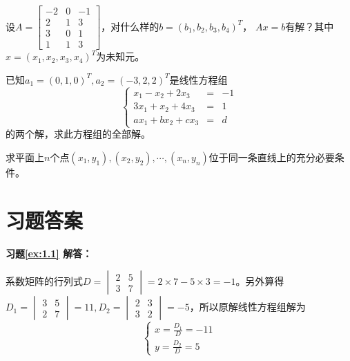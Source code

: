 \begin{ex} \label{ex:1.8}
设$A = \begin{bmatrix} -2 & 0 & -1 \\ 2 & 1 & 3 \\ 3 & 0 & 1 \\ 1 & 1 & 3 \end{bmatrix}$，对什么样的$b = (b_1, b_2, b_3, b_4)^T$， $Ax = b$有解？其中$x = (x_1, x_2, x_3, x_4)^T$为未知元。
\end{ex}

\begin{ex} \label{ex:1.9}
已知$a_1 = (0,1,0)^T, a_2 = (-3,2,2)^T$是线性方程组
$$\left\{ \begin{array}{rcl} x_1 - x_2 + 2x_3 & = & -1 \\ 3x_1 + x_2 + 4x_3 & = & 1 \\ ax_1 + bx_2 + cx_3 & = & d\end{array}\right.$$
的两个解，求此方程组的全部解。
\end{ex}

\begin{ex} \label{ex:1.10}
求平面上$n$个点$(x_1,y_1),(x_2,y_2),\cdots,(x_n,y_n)$位于同一条直线上的充分必要条件。
\end{ex}

\newpage


\section{习题答案}

\textbf{习题\ref{ex:1.1} 解答：}

\enum
\item[(1)] 系数矩阵的行列式$D = \begin{vmatrix} 2 & 5 \\ 3 & 7 \end{vmatrix} = 2\times 7 - 5\times 3 = -1$。另外算得$D_1 = \begin{vmatrix} 3 & 5 \\ 2 & 7 \end{vmatrix} = 11, D_2 = \begin{vmatrix} 2 & 3 \\ 3 & 2 \end{vmatrix} = -5$，所以原解线性方程组解为
$$\begin{cases} x = \frac{D_1}{D} = -11 \\ y = \frac{D_2}{D} = 5 \end{cases}$$

